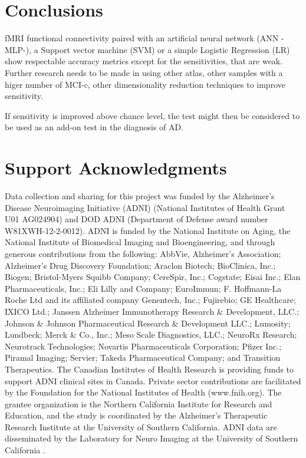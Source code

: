 \documentclass[a4paper,12pt]{elsarticle}  %
\begin{document}
\part{Conclusions}

	fMRI functional connectivity paired with an artificial neural network (ANN -MLP-), a Support vector machine (SVM) or a simple Logistic Regression (LR) show respectable accuracy metrics except for the sensitivities, that are weak. Further research needs to be made in using other atlas, other samples with a higer number of MCI-c, other dimensionality reduction techniques to improve sensitivity. 
	
	If sensitivity is improved above chance level, the test might then be considered to be used as an add-on test in the diagnosis of AD.




\part{Support Acknowledgments} \label{support acknowledgements}

Data collection and sharing for this project was funded by the Alzheimer's Disease
Neuroimaging Initiative (ADNI) (National Institutes of Health Grant U01 AG024904) and
DOD ADNI (Department of Defense award number W81XWH-12-2-0012). ADNI is funded
by the National Institute on Aging, the National Institute of Biomedical Imaging and
Bioengineering, and through generous contributions from the following: AbbVie, Alzheimer’s
Association; Alzheimer’s Drug Discovery Foundation; Araclon Biotech; BioClinica, Inc.;
Biogen; Bristol-Myers Squibb Company; CereSpir, Inc.; Cogstate; Eisai Inc.; Elan
Pharmaceuticals, Inc.; Eli Lilly and Company; EuroImmun; F. Hoffmann-La Roche Ltd and
its affiliated company Genentech, Inc.; Fujirebio; GE Healthcare; IXICO Ltd.; Janssen
Alzheimer Immunotherapy Research \& Development, LLC.; Johnson \& Johnson
Pharmaceutical Research \& Development LLC.; Lumosity; Lundbeck; Merck \& Co., Inc.;
Meso Scale Diagnostics, LLC.; NeuroRx Research; Neurotrack Technologies; Novartis
Pharmaceuticals Corporation; Pfizer Inc.; Piramal Imaging; Servier; Takeda Pharmaceutical
Company; and Transition Therapeutics. The Canadian Institutes of Health Research is
providing funds to support ADNI clinical sites in Canada. Private sector contributions are
facilitated by the Foundation for the National Institutes of Health (www.fnih.org). The grantee
organization is the Northern California Institute for Research and Education, and the study is
coordinated by the Alzheimer’s Therapeutic Research Institute at the University of Southern
California. ADNI data are disseminated by the Laboratory for Neuro Imaging at the
University of Southern California \cite{adni_data_use_agreement}.
\end{document}
